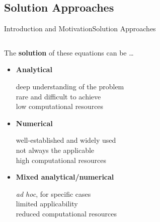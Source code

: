 \subsection{Solution Approaches}

\begin{frame}{Introduction and Motivation}{Solution Approaches}
  \begin{columns}
    \begin{column}[c]{0.45\textwidth}
      The \textbf{solution} of these equations can be \dots \\
      \begin{itemize}[<+->]
        \item \textbf{Analytical} \\
        \begin{small}
          \qquad \textcolor{mycolor2!95!black}{deep understanding of the problem} \\
          \qquad \textcolor{mycolor2!95!black}{rare and difficult to achieve} \\
          \qquad \textcolor{mycolor5!95!black}{low computational resources}
        \end{small}
        \item \textbf{Numerical} \\
        \begin{small}
          \qquad \textcolor{mycolor5!95!black}{well-established and widely used} \\
          \qquad \textcolor{mycolor3!95!black}{not always the applicable} \\
          \qquad \textcolor{mycolor2!95!black}{high computational resources}
        \end{small}
        \item \textbf{Mixed analytical/numerical} \\
        \begin{small}
          \qquad \textcolor{mycolor3!95!black}{\emph{ad hoc}, for specific cases} \\
          \qquad \textcolor{mycolor3!95!black}{limited applicability} \\
          \qquad \textcolor{mycolor3!95!black}{reduced computational resources}
        \end{small}
      \end{itemize}
    \end{column}

\end{columns}
\end{frame}
